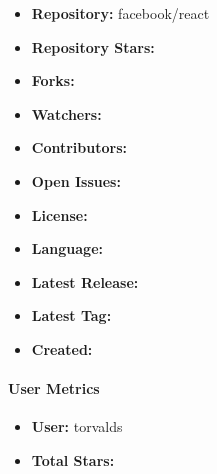 \documentclass{article}
\begin{document}
\begin{itemize}
    \item \textbf{Repository:} facebook/react
    \item \textbf{Repository Stars:} 
    \item \textbf{Forks:} 
    \item \textbf{Watchers:} 
    \item \textbf{Contributors:} 
    \item \textbf{Open Issues:} 
    \item \textbf{License:} 
    \item \textbf{Language:} 
    \item \textbf{Latest Release:} 
    \item \textbf{Latest Tag:} 
    \item \textbf{Created:} 
\end{itemize}

\paragraph{User Metrics}

\begin{itemize}
    \item \textbf{User:} torvalds
    \item \textbf{Total Stars:} 
\end{itemize}
\end{document}
